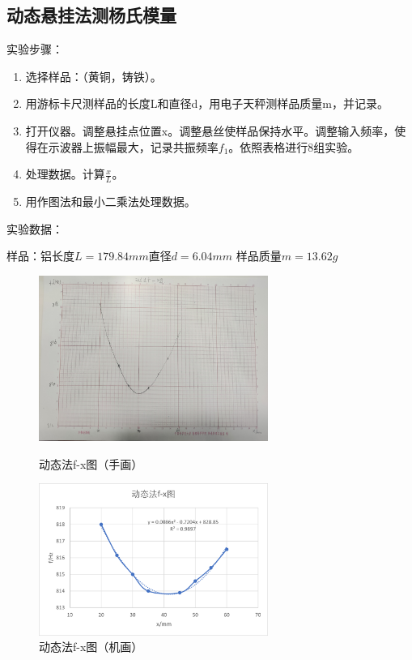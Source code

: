 \documentclass[11pt]{article}
\newcommand{\others}{$\square$}
\newcommand{\othersYes}{$\square$\hspace{-1em}$\surd$}
\begin{document}
\subsection{动态悬挂法测杨氏模量}
\noindent 实验步骤：
\begin{enumerate}
    \item 选择样品：（黄铜\makebox[3em][c]{\others}，铸铁\makebox[3em][c]{\othersYes}）。
    \item 用游标卡尺测样品的长度L和直径d，用电子天秤测样品质量m，并记录。
    \item 打开仪器。调整悬挂点位置x。调整悬丝使样品保持水平。调整输入频率，使得在示波器上振幅最大，记录共振频率$f_1$。依照表格进行8组实验。
    \item 处理数据。计算$\frac{x}{L}$。
    \item 用作图法和最小二乘法处理数据。
\end{enumerate}
\noindent 实验数据：
\par 样品：铝\qquad 长度$L=179.84mm$\qquad 直径$d=6.04mm$ \qquad 样品质量$m=13.62g$
\begin{figure}[H]
    \centering
    \begin{minipage}[t]{0.49\linewidth}
        \centering
        \includegraphics[width=7.5cm]{Fig/7.jpg}
        \caption{动态法f-x图（手画）}
        \label{fig:7}
    \end{minipage}
    \begin{minipage}[t]{0.49\linewidth}
        \centering
        \includegraphics[width=7.5cm]{Fig/8.png}
        \caption{动态法f-x图（机画）}
        \label{fig:8}
    \end{minipage}
\end{figure}
\end{document}
